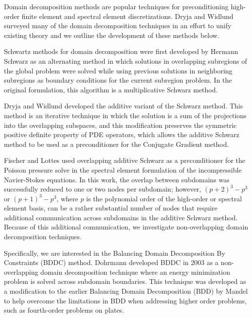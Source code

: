 Domain decomposition methods are popular techniques for preconditioning high-order finite element and spectral element discretizations.
Dryja and Widlund surveyed many of the domain decomposition techniques in an effort to unify existing theory \cite{dryja1989towards} and we outline the development of these methods below.

Schwartz methods for domain decomposition were first developed by Hermann Schwarz \cite{schwarz1972gesammelte} as an alternating method in which solutions in overlapping subregions of the global problem were solved while using previous solutions in neighboring subregions as boundary conditions for the current subregion problem.
In the original formulation, this algorithm is a multiplicative Schwarz method.

Dryja and Widlund \cite{widlund1987additive,dryja1989additive} developed the additive variant of the Schwarz method.
This method is an iterative technique in which the solution is a sum of the projections into the overlapping subspaces, and this modification preserves the symmetric positive definite property of PDE operators, which allows the additive Schwarz method to be used as a preconditioner for the Conjugate Gradient method.

Fischer and Lottes \cite{fischer1997overlapping,fischer2005hybrid} used overlapping additive Schwarz as a preconditioner for the Poisson pressure solve in the spectral element formulation of the incompressible Navier-Stokes equations.
In this work, the overlap between subdomains was successfully reduced to one or two nodes per subdomain; however, $\left( p + 2 \right)^3 - p^3$ or $\left( p + 1 \right)^3 - p^3$, where $p$ is the polynomial order of the high-order or spectral element basis, can be a rather substantial number of nodes that require additional communication across subdomains in the additive Schwarz method.
Because of this additional communication, we investigate non-overlapping domain decomposition techniques.

Specifically, we are interested in the Balancing Domain Decomposition By Constraints (BDDC) method.
Dohrmann \cite{dohrmann2003preconditioner} developed BDDC in 2003 as a non-overlapping domain decomposition technique where an energy minimization problem is solved across subdomain boundaries.
This technique was developed as a modification to the earlier Balancing Domain Decomposition (BDD) by Mandel \cite{mandel1993balancing} to help overcome the limitations in BDD when addressing higher order problems, such as fourth-order problems on plates.

